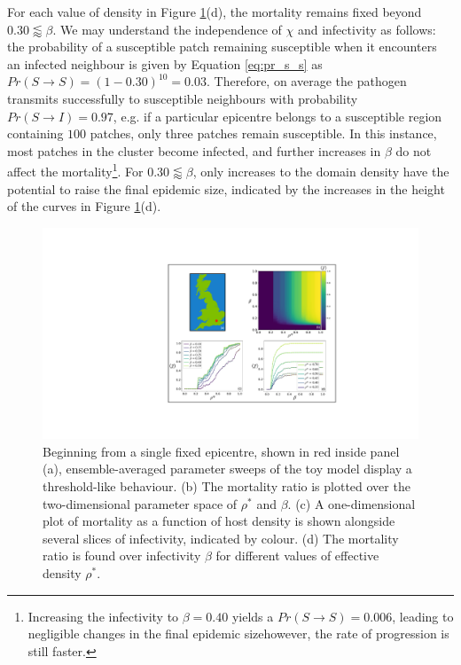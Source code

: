 For each value of density in Figure \ref{fig:heterogeneous-phase-space}(d), 
the mortality remains fixed beyond $0.30 \lessapprox \beta$.
We may understand the independence of $\chi$ and infectivity as follows:
the probability of a susceptible patch remaining susceptible when it encounters 
an infected neighbour is given by Equation \ref{eq:pr_s_s} as $Pr(S \rightarrow S) = (1 - 0.30)^{10} = 0.03$. 
Therefore, on average the pathogen transmits successfully to susceptible neighbours with probability $Pr(S\rightarrow I)=0.97$, 
e.g. if a particular epicentre belongs to a susceptible region containing $100$ patches, only three patches remain susceptible. 
In this instance, most patches in the cluster become infected, and further increases in $\beta$ do not affect the 
mortality\footnote{
Increasing the infectivity to $\beta=0.40$ yields a $Pr(S \rightarrow S) = 0.006$, 
leading to negligible changes in the final epidemic size\textemdash however, the rate of progression is still faster.
}. 
For $0.30 \lessapprox \beta$, only increases to the domain density have the potential to raise the final epidemic size, 
indicated by the increases in the height of the curves in Figure \ref{fig:heterogeneous-phase-space}(d). 

\begin{figure}
    \centering
    \includegraphics[scale=0.55]{chapter4/figures/figure4-param-sweeps.pdf}
    \caption{
    Beginning from a single fixed epicentre, shown in red inside panel (a),
    ensemble-averaged parameter sweeps of the toy model display a threshold-like behaviour.
    (b) The mortality ratio is plotted over the two-dimensional parameter space of $\rho^*$ and $\beta$. 
    (c) A one-dimensional plot of mortality as a function of host density is shown alongside several slices of infectivity, indicated by colour.
    (d) The mortality ratio is found over infectivity $\beta$ for different values of effective density $\rho^{*}$.
    }
    \label{fig:heterogeneous-phase-space}
\end{figure}

